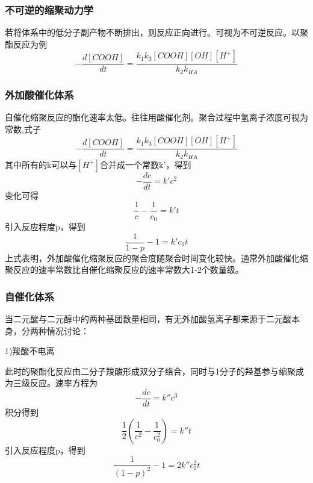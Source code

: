 ﻿\documentclass[12pt,a4paper]{article}
\begin{document}
\subsubsection{不可逆的缩聚动力学}

若将体系中的低分子副产物不断排出，则反应正向进行。可视为不可逆反应。以聚酯反应为例
$$-\frac{d[COOH]}{dt}=\frac{k_1k_3[COOH][OH][H^+]}{k_2k_{HA}}$$
\subsubsection*{外加酸催化体系}
自催化缩聚反应的酯化速率太低。往往用酸催化剂。聚合过程中氢离子浓度可视为常数,式子
$$-\frac{d[COOH]}{dt}=\frac{k_1k_3[COOH][OH][H^+]}{k_2k_{HA}}$$
其中所有的k可以与$[H^+]$合并成一个常数k'，得到
$$-\frac{dc}{dt}=k'c^2$$
变化可得$$\frac{1}{c}-\frac{1}{c_0}=k't$$
引入反应程度p，得到$$\frac{1}{1-p}-1=k'c_0t$$
上式表明，外加酸催化缩聚反应的聚合度随聚合时间变化较快。通常外加酸催化缩聚反应的速率常数比自催化缩聚反应的速率常数大1-2个数量级。
\subsubsection*{自催化体系}
当二元酸与二元醇中的两种基团数量相同，有无外加酸氢离子都来源于二元酸本身，分两种情况讨论：

1)羧酸不电离

此时的聚酯化反应由二分子羧酸形成双分子络合，同时与1分子的羟基参与缩聚成为三级反应。速率方程为$$-\frac{dc}{dt}=k''c^3$$
积分得到$$\frac{1}{2}\left(\frac{1}{c^2}-\frac{1}{c_0^2}\right)=k''t$$
引入反应程度p，得到$$\frac{1}{(1-p)^2}-1=2k''c_0^2t$$
\end{document}
